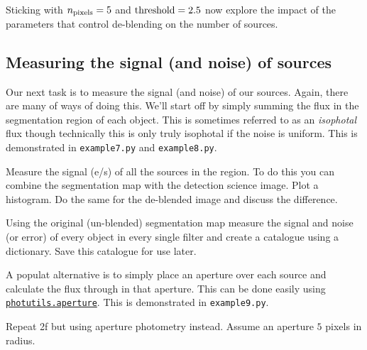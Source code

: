 \documentclass{article}
\begin{document}
\begin{question}
Sticking with $n_{\rm pixels} = 5$ and ${\rm threshold} = 2.5$ now explore the impact of the parameters that control de-blending on the number of sources.
\end{question}


\subsection{Measuring the signal (and noise) of sources}


Our next task is to measure the signal (and noise) of our sources. Again, there are many of ways of doing this. We'll start off by simply summing the flux in the segmentation region of each object. This is sometimes referred to as an {\em isophotal} flux though technically this is only truly isophotal if the noise is uniform. This is demonstrated in \texttt{example7.py} and \texttt{example8.py}.

\begin{question}
Measure the signal (e/s) of all the sources in the region. To do this you can combine the segmentation map with the detection science image. Plot a histogram. Do the same for the de-blended image and discuss the difference.
\end{question}

\begin{question}
Using the original (un-blended) segmentation map measure the signal and noise (or error) of every object in every single filter and create a catalogue using a dictionary. Save this catalogue for use later.
\end{question}

A populat alternative is to simply place an aperture over each source and calculate the flux through in that aperture. This can be done easily using \href{https://photutils.readthedocs.io/en/stable/aperture.html}{\texttt{photutils.aperture}}. This is demonstrated in \texttt{example9.py}.


\begin{question}
Repeat 2f but using aperture photometry instead. Assume an aperture $5$ pixels in radius.
\end{question}

\end{document}
